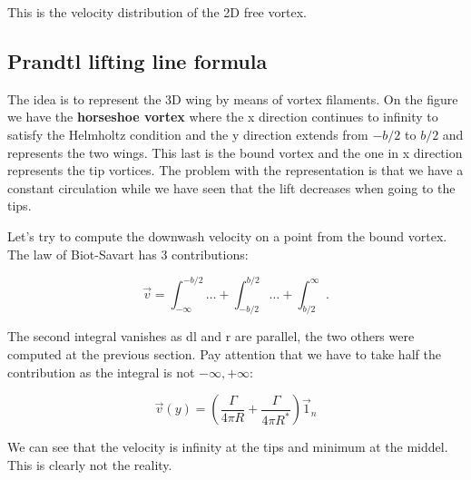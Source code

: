 	This is the velocity distribution of the 2D free vortex. 
	
\subsection{Prandtl lifting line formula}
	The idea is to represent the 3D wing by means of vortex filaments. On the figure we have the \textbf{horseshoe vortex} where the x direction continues to infinity to satisfy the Helmholtz condition and the y direction extends from $-b/2$ to $b/2$ and represents the two wings. This last is the bound vortex and the one in x direction represents the tip vortices. The problem with the representation is that we have a constant circulation while we have seen that the lift decreases when going to the tips. 
	
	Let's try to compute the downwash velocity on a point from the bound vortex. The law of Biot-Savart has 3 contributions: 
	
	\begin{equation}
	\vec{v} = \int _{-\infty} ^{-b/2} \dots + \int _{-b/2} ^{b/2} \dots + \int _{b/2}^{\infty}.
	\end{equation}
	
	The second integral vanishes as dl and r are parallel, the two others were computed at the previous section. Pay attention that we have to take half the contribution as the integral is not $-\infty,+\infty$:
	
	\begin{equation}
	\vec{v}(y) = \left(\frac{\Gamma}{4\pi R} + \frac{\Gamma}{4\pi R^*} \right) \vec{1}_n
	\end{equation}
	
	We can see that the velocity is infinity at the tips and minimum at the middel. This is clearly not the reality. 
	
